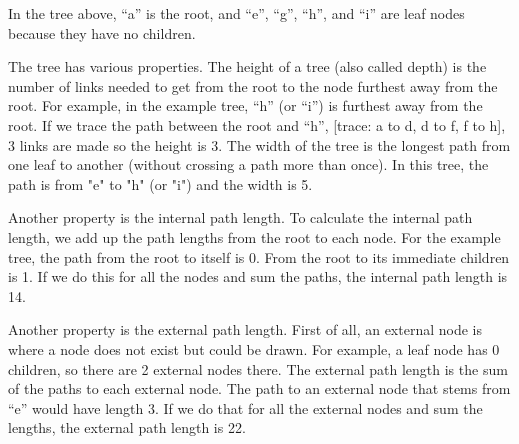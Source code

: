 In the tree above, “a” is the root, and “e”, “g”, “h”, and “i” are leaf nodes because they have no children. 

The tree has various properties. The height of a tree (also called depth) is the number of links needed to get from the root to the node furthest away from the root. For example, in the example tree, “h” (or “i”) is furthest away from the root. If we trace the path between the root and “h”, [trace: a to d, d to f, f to h], 3 links are made so the height is 3. The width of the tree is the longest path from one leaf to another (without crossing a path more than once). In this tree, the path is from "e" to "h" (or "i") and the width is 5. 

Another property is the internal path length. To calculate the internal path length, we add up the path lengths from the root to each node. For the example tree, the path from the root to itself is 0. From the root to its immediate children is 1. If we do this for all the nodes and sum the paths, the internal path length is 14. 

Another property is the external path length. First of all, an external node is where a node does not exist but could be drawn. For example, a leaf node has 0 children, so there are 2 external nodes there. The external path length is the sum of the paths to each external node. The path to an external node that stems from “e” would have length 3. If we do that for all the external nodes and sum the lengths, the external path length is 22. 

